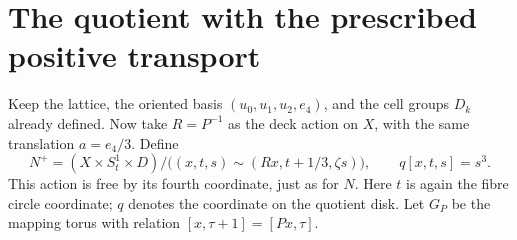 \section{The quotient with the prescribed positive transport}

Keep the lattice, the oriented basis $(u_0,u_1,u_2,e_4)$, and the
cell groups $D_k$ already defined. Now take $R=P^{-1}$ as the deck
action on $X$, with the same translation $a=e_4/3$. Define
\begin{equation}\label{eq:positive-quotient}
 N^+=(X\times S^1_t\times D)/
 \bigl((x,t,s)\sim(Rx,t+1/3,\zeta s)\bigr),
 \qquad q[x,t,s]=s^3.
\end{equation}
This action is free by its fourth coordinate, just as for $N$.
Here $t$ is again the fibre circle coordinate; $q$ denotes the
coordinate on the quotient disk. Let $G_P$ be the mapping torus
with relation $[x,\tau+1]=[Px,\tau]$.

